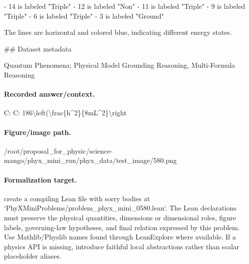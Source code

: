 - 14 is labeled "Triple"
- 12 is labeled "Non"
- 11 is labeled "Triple"
- 9 is labeled "Triple"
- 6 is labeled "Triple"
- 3 is labeled "Ground"

The lines are horizontal and colored blue, indicating different energy states.

\#\# Dataset metadata

Quantum Phenomena; Physical Model Grounding Reasoning, Multi-Formula Reasoning

\paragraph{Recorded answer/context.}
C: C: 186\textbackslash{}left(\textbackslash{}frac\{h\textasciicircum{}2\}\{8mL\textasciicircum{}2\}\textbackslash{}right

\paragraph{Figure/image path.}
/root/proposal\_for\_physic/science-mango/phyx\_mini\_run/phyx\_data/test\_image/580.png

\paragraph{Formalization target.}
create a compiling Lean file with sorry bodies at `PhyXMiniProblems/problem\_phyx\_mini\_0580.lean`. The Lean declarations must preserve the physical quantities, dimensions or dimensional roles, figure labels, governing-law hypotheses, and final relation expressed by this problem.
Use Mathlib/Physlib names found through LeanExplore where available. If a physics API is missing, introduce faithful local abstractions rather than scalar placeholder aliases.

